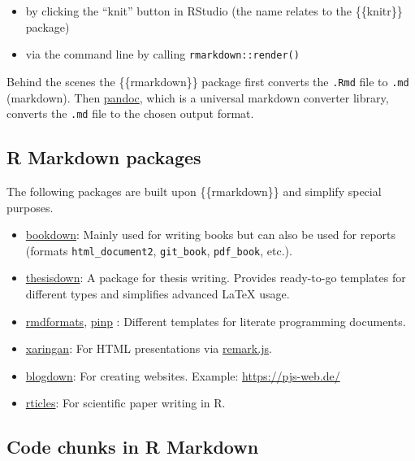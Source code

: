\documentclass[]{book}
\begin{document}
\begin{itemize}
\item
  by clicking the ``knit'' button in RStudio (the name relates to the \{\{knitr\}\} package)
\item
  via the command line by calling \texttt{rmarkdown::render()}
\end{itemize}

Behind the scenes the \{\{rmarkdown\}\} package first converts the \texttt{.Rmd} file to \texttt{.md} (markdown).
Then \href{https://pandoc.org/}{pandoc}, which is a universal markdown converter library, converts the \texttt{.md} file to the chosen output format.

\hypertarget{r-markdown-packages}{%
\subsection{R Markdown packages}\label{r-markdown-packages}}

The following packages are built upon \{\{rmarkdown\}\} and simplify special purposes.

\begin{itemize}
\item
  \href{https://bookdown.org/yihui/bookdown/}{bookdown}: Mainly used for writing books but can also be used for reports (formats \texttt{html\_document2}, \texttt{git\_book}, \texttt{pdf\_book}, etc.).
\item
  \href{https://github.com/ismayc/thesisdown}{thesisdown}: A package for thesis writing.
  Provides ready-to-go templates for different types and simplifies advanced LaTeX usage.
\item
  \href{https://github.com/juba/rmdformats}{rmdformats}, \href{https://github.com/eddelbuettel/pinp}{pinp} : Different templates for literate programming documents.
\item
  \href{https://github.com/yihui/xaringan}{xaringan}: For HTML presentations via \href{https://remarkjs.com}{remark.js}.
\item
  \href{https://github.com/rstudio/blogdown}{blogdown}: For creating websites. Example: \url{https://pjs-web.de/}
\item
  \href{https://github.com/rstudio/rticles}{rticles}: For scientific paper writing in R.
\end{itemize}

\hypertarget{code-chunks-in-r-markdown}{%
\subsection{Code chunks in R Markdown}\label{code-chunks-in-r-markdown}}
\end{document}
